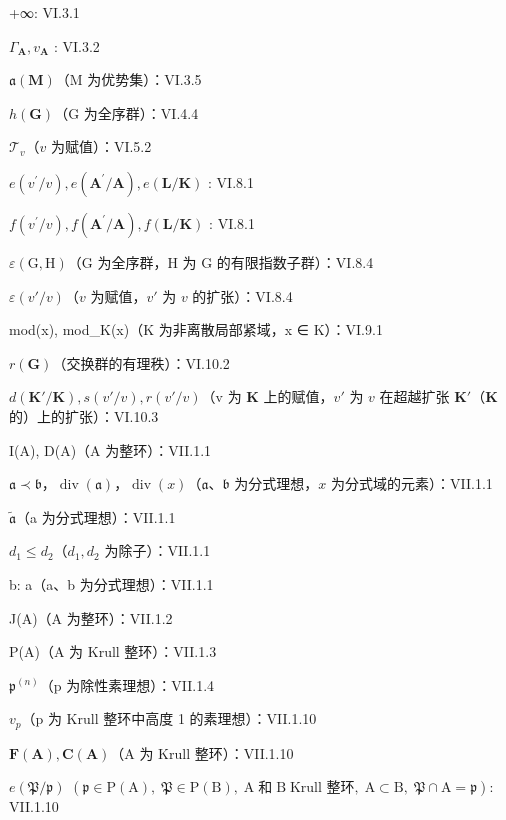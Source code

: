 +∞: VI.3.1

\(\Gamma_{\mathbf{A}}, v_{\mathbf{A}}\) : VI.3.2

\(\mathfrak{a}(\mathbf{M})\)（M 为优势集）：VI.3.5

\(h(\mathbf{G})\)（G 为全序群）：VI.4.4

\(\mathcal{T}_v\)（\(v\) 为赋值）：VI.5.2

\(e(v^{\prime} / v), e(\mathbf{A}^{\prime} / \mathbf{A}), e(\mathbf{L} / \mathbf{K})\) : VI.8.1

\(f(v^{\prime} / v),f(\mathbf{A}^{\prime} / \mathbf{A}),f(\mathbf{L} / \mathbf{K})\) : VI.8.1

\(\varepsilon (\mathrm{G},\mathrm{H})\)（G 为全序群，H 为 G 的有限指数子群）：VI.8.4

\(\varepsilon(v'/v)\)（\(v\) 为赋值，\(v'\) 为 \(v\) 的扩张）：VI.8.4

mod(x), mod\_K(x)（K 为非离散局部紧域，x ∈ K）：VI.9.1

\(r(\mathbf{G})\)（交换群的有理秩）：VI.10.2

\(d(\mathbf{K}' / \mathbf{K}), s(v' / v), r(v' / v)\)（v 为 \(\mathbf{K}\) 上的赋值，\(v'\) 为 \(v\) 在超越扩张 \(\mathbf{K}'\)（\(\mathbf{K}\) 的）上的扩张）：VI.10.3

I(A), D(A)（A 为整环）：VII.1.1

\(\mathfrak{a} \prec \mathfrak{b}\)，\(\operatorname{div}(\mathfrak{a})\)，\(\operatorname{div}(x)\)（\(\mathfrak{a}\)、\(\mathfrak{b}\) 为分式理想，\(x\) 为分式域的元素）：VII.1.1

\(\tilde{\mathfrak{a}}\)（a 为分式理想）：VII.1.1

\(d_{1} \leqslant d_{2}\)（\(d_{1}, d_{2}\) 为除子）：VII.1.1

b: a（a、b 为分式理想）：VII.1.1

J(A)（A 为整环）：VII.1.2

P(A)（A 为 Krull 整环）：VII.1.3

\(\mathfrak{p}^{(n)}\)（p 为除性素理想）：VII.1.4

\(v_{p}\)（p 为 Krull 整环中高度 1 的素理想）：VII.1.10

\(\mathbf{F}(\mathbf{A}), \mathbf{C}(\mathbf{A})\)（A 为 Krull 整环）：VII.1.10

\(e(\mathfrak{P}/\mathfrak{p})\) \((\mathfrak{p}\in\mathrm{P}(\mathrm{A}),\;\mathfrak{P}\in\mathrm{P}(\mathrm{B}),\;\mathrm{A}\;\text{和}\;\mathrm{B}\;\text{Krull 整环},\;\mathrm{A}\subset\mathrm{B},\;\mathfrak{P}\cap\mathrm{A}=\mathfrak{p}):\) VII.1.10

